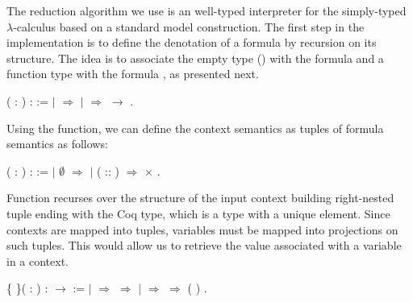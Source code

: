 The reduction algorithm we use is an well-typed interpreter for the simply-typed $\lambda$-calculus based on a
standard model construction. The first step in the implementation is to define the denotation of a formula by
recursion on its structure. The idea is to associate the empty type () with the formula  and a
function type with the formula   , as presented next.
 \begin{coqdoccode}
\coqdocemptyline
\coqdocemptyline
\coqdocnoindent
{}  ( : \coqdocvar{$\alpha$}) :  :=\coqdoceol
\coqdocindent{1.00em}
  \coqdoceol
\coqdocindent{1.00em}
\ensuremath{|}  \ensuremath{\Rightarrow} \coqdoceol
\coqdocindent{1.00em}
\ensuremath{|}    \ensuremath{\Rightarrow}   \ensuremath{\rightarrow}  \coqdoceol
\coqdocindent{1.00em}
.\coqdoceol
\coqdocemptyline
\end{coqdoccode}
Using the  function, we can define the context semantics as tuples
of formula semantics as follows:
 \begin{coqdoccode}
\coqdocemptyline
\coqdocnoindent
{}  ( : \coqdocvar{$\Gamma$}) :  :=\coqdoceol
\coqdocindent{1.00em}
  \coqdoceol
\coqdocindent{1.00em}
\ensuremath{|} $\emptyset$ \ensuremath{\Rightarrow} \coqdoceol
\coqdocindent{1.00em}
\ensuremath{|} ( :: ) \ensuremath{\Rightarrow}   \ensuremath{\times}  \coqdoceol
\coqdocindent{1.00em}
.\coqdoceol
\end{coqdoccode}
Function  recurses over the structure of the input context building
right-nested tuple ending with the Coq  type, which is a type with a
unique element. Since contexts are mapped into tuples, variables must be
mapped into projections on such tuples. This would allow us to retrieve the
value associated with a variable in a context.
\pagebreak
\begin{coqdoccode}
\coqdocemptyline
\coqdocnoindent
{}  \{ \}( :   )\coqdoceol
\coqdocindent{1.00em}
:   \ensuremath{\rightarrow}   :=\coqdoceol
\coqdocindent{2.00em}
  \coqdoceol
\coqdocindent{2.00em}
\ensuremath{|}  \ensuremath{\Rightarrow}   \ensuremath{\Rightarrow}  \coqdoceol
\coqdocindent{2.00em}
\ensuremath{|}   \ensuremath{\Rightarrow}   \ensuremath{\Rightarrow}   ( )\coqdoceol
\coqdocindent{2.00em}
.\coqdoceol
\coqdocemptyline
\end{coqdoccode}

